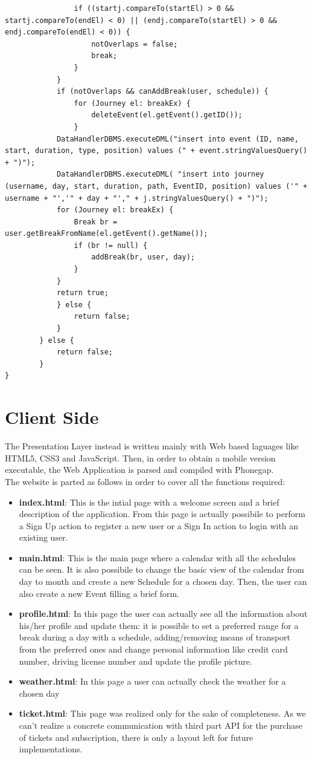 \documentclass[numbers=noenddot, 12pt, a4paper, oneside]{scrbook}
\begin{document}
\begin{lstlisting}
				if ((startj.compareTo(startEl) > 0 && startj.compareTo(endEl) < 0) || (endj.compareTo(startEl) > 0 && endj.compareTo(endEl) < 0)) {
					notOverlaps = false;
					break;
				}
			}
			if (notOverlaps && canAddBreak(user, schedule)) {
				for (Journey el: breakEx) {
					deleteEvent(el.getEvent().getID());
				}
			DataHandlerDBMS.executeDML("insert into event (ID, name, start, duration, type, position) values (" + event.stringValuesQuery() + ")");
			DataHandlerDBMS.executeDML( "insert into journey (username, day, start, duration, path, EventID, position) values ('" + username + "','" + day + "'," + j.stringValuesQuery() + ")");
			for (Journey el: breakEx) {
				Break br = user.getBreakFromName(el.getEvent().getName());
				if (br != null) {
					addBreak(br, user, day);
				}
			}
			return true;
			} else {
				return false;
			}
		} else {
			return false;
		}
}
\end{lstlisting}

\section*{Client Side}

The Presentation Layer instead is written mainly with Web based laguages like HTML5, CSS3 and JavaScript. Then, in order to obtain a mobile version executable, the Web Application is parsed and compiled with Phonegap. \\

The website is parted as follows in order to cover all the functions required:
\begin{itemize}
	\item \textbf{index.html}: This is the intial page with a welcome screen and a brief description of the application. From this page is actually possibile to perform a Sign Up action to register a new user or a Sign In action to login with an existing user.
	\item \textbf{main.html}: This is the main page where a calendar with all the schedules can be seen. It is also possibile to change the basic view of the calendar from day to month and create a new Schedule for a chosen day. Then, the user can also create a new Event filling a brief form. 
	\item \textbf{profile.html}: In this page the user can actually see all the information about his/her profile and update them: it is possible to set a preferred range for a break during a day with a schedule, adding/removing means of transport from the preferred ones and change personal information like credit card number, driving license number and update the profile picture.
	\item \textbf{weather.html}: In this page a user can actually check the weather for a chosen day
	\item \textbf{ticket.html}: This page was realized only for the sake of completeness. As we can't realize a concrete communication with third part API for the purchase of tickets and subscription, there is only a layout left for future implementations.
\end{itemize}
\end{document}

